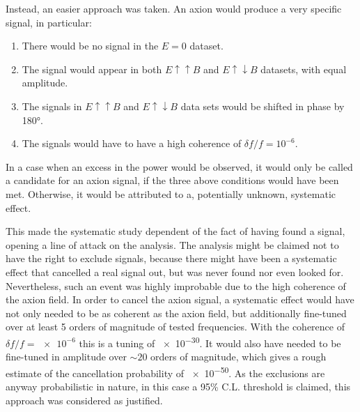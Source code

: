 Instead, an easier approach was taken. An axion would produce a very specific signal, in particular:
\begin{enumerate}
  \item There would be no signal in the $E=0$ dataset.
  \item The signal would appear in both $E \uparrow \uparrow B$ and $E \uparrow \downarrow B$ datasets, with equal amplitude.
  \item The signals in $E \uparrow \uparrow B$ and $E \uparrow \downarrow B$ data sets would be shifted in phase by \ang{180}.
  \item The signals would have to have a high coherence of $\delta f / f = 10^{-6}$.
\end{enumerate}
In a case when an excess in the power would be observed, it would only be called a candidate for an axion signal, if the three above conditions would have been met. Otherwise, it would be attributed to a, potentially unknown, systematic effect.

This made the systematic study dependent of the fact of having found a signal, opening a line of attack on the analysis. The analysis might be claimed not to have the right to exclude signals, because there might have been a systematic effect that cancelled a real signal out, but was never found nor even looked for. Nevertheless, such an event was highly improbable due to the high coherence of the axion field. In order to cancel the axion signal, a systematic effect would have not only needed to be as coherent as the axion field, but additionally fine-tuned over at least 5 orders of magnitude of tested frequencies. With the coherence of $\delta f / f = \num{e-6}$ this is a tuning of \num{e-30}. It would also have needed to be fine-tuned in amplitude over $\sim 20$ orders of magnitude, which gives a rough estimate of the cancellation probability of \num{e-50}. As the exclusions are anyway probabilistic in nature, in this case a 95\% C.L. threshold is claimed, this approach was considered as justified.




